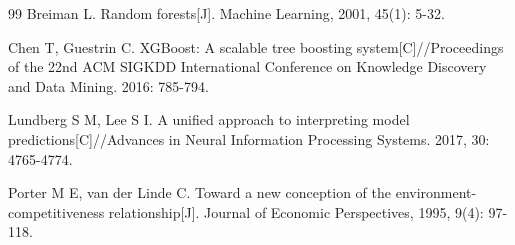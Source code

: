 \documentclass[12pt,a4paper]{ctexart}
\begin{document}
\begin{thebibliography}{99}
Breiman L. Random forests[J]. Machine Learning, 2001, 45(1): 5-32.

Chen T, Guestrin C. XGBoost: A scalable tree boosting system[C]//Proceedings of the 22nd ACM SIGKDD International Conference on Knowledge Discovery and Data Mining. 2016: 785-794.

Lundberg S M, Lee S I. A unified approach to interpreting model predictions[C]//Advances in Neural Information Processing Systems. 2017, 30: 4765-4774.

Porter M E, van der Linde C. Toward a new conception of the environment-competitiveness relationship[J]. Journal of Economic Perspectives, 1995, 9(4): 97-118.

\end{thebibliography}
\end{document}

